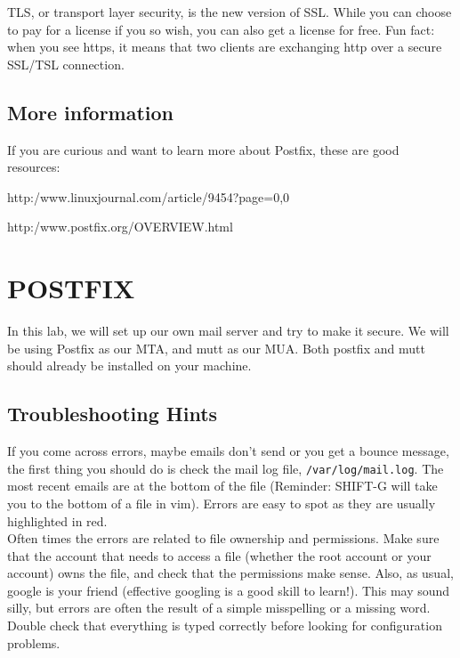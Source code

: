 \documentclass{article}
\begin{document}
TLS, or transport layer security, is the new version of SSL. While you can choose to pay for a license if you so wish, you can also get a license for free. Fun fact: when you see https, it means that two clients are exchanging http over a secure SSL/TSL connection.

\subsection*{More information}

If you are curious and want to learn more about Postfix, these are good resources:

http:/www.linuxjournal.com/article/9454?page=0,0

http:/www.postfix.org/OVERVIEW.html



\section*{POSTFIX}

In this lab, we will set up our own mail server and try to make it secure. We will be using Postfix as our MTA, and mutt as our MUA. Both postfix and mutt should already be installed on your machine.



\subsection*{Troubleshooting Hints}

\indent\indent If you come across errors, maybe emails don't send or you get a bounce message, the first thing you should do is check the mail log file, \verb|/var/log/mail.log|. The most recent emails are at the bottom of the file (Reminder: SHIFT-G will take you to the bottom of a file in vim). Errors are easy to spot as they are usually highlighted in red. \\

Often times the errors are related to file ownership and permissions. Make sure that the account that needs to access a file (whether the root account or your account) owns the file, and check that the permissions make sense. Also, as usual, google is your friend (effective googling is a good skill to learn!). This may sound silly, but errors are often the result of a simple misspelling or a missing word. Double check that everything is typed correctly before looking for configuration problems. \\
\end{document}
